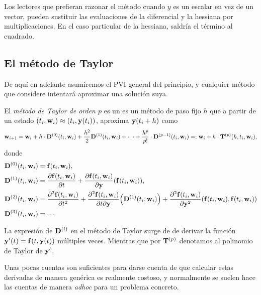 Los lectores que prefieran razonar el método
cuando $y$ es un escalar en vez de un vector,
pueden sustituir las evaluaciones de la diferencial y la hessiana
por multiplicaciones.
En el caso particular de la hessiana, saldría el término al cuadrado.

\subsection{El método de Taylor}
 
De aquí en adelante asumiremos el PVI general del principio,
y cualquier método que considere intentará aproximar una solución suya.

\begin{method}\label{met:taylor}
    \newcommand{\D}{\vb{D}}

    El \emph{método de Taylor de orden $p$} es un es un método de paso fijo $h$
    que a partir de un estado $(t_i, \vb{w}_i) \approx (t_i, \vb{y}(t_i))$,
    aproxima $\vb{y}(t_i + h)$ como
    \begin{equation*}
        \vw_{i+1} =
        \vw_i + h\cdot \D^{(0)}(t_i, \vw_i)
            + \frac{h^2}{2}\D^{(1)}(t_i, \vw_i)
            + \cdots
            + \frac{h^p}{p!}\cdot \D^{(p-1)}(t_i, \vw_i) =:
        \vw_i + h\cdot \vb{T}^{(p)}(h, t_i, \vw_i),
    \end{equation*}
    donde
    \begin{align*}
        \D^{(0)}(t_i, \vw_i) &= \vf(t_i, \vw_i), \\
        \D^{(1)}(t_i, \vw_i) &=
            \pdv{\vf(t_i, \vw_i)}{t} +
            \pdv{\vf(t_i, \vw_i)}{\vy}\qty(\vf(t_i, \vw_i)), \\
        \D^{(2)}(t_i, \vw_i) &=
            \pdv[2]{\vf(t_i, \vw_i)}{t} +
            \pdv{\vf(t_i, \vw_i)}{t}{\vy}\qty(\D^{(1)}(t_i, \vw_i)) +
            \pdv[2]{\vf(t_i, \vw_i)}{\vy}\qty(
                \vf(t_i, \vw_i), \vf(t_i, \vw_i)
            ) \\
        \D^{(3)}(t_i, \vw_i) &= \cdots
    \end{align*}
\end{method}

\begin{remark}
    La expresión de $\vb{D}^{(i)}$ en el método de Taylor surge
    de de derivar la función $\vb{y}'(t) = \vb{f}(t, \vb{y}(t))$ múltiples veces.
    Mientras que por $\vb{T}^{(p)}$ denotamos al
    polinomio de Taylor de $\vb{y}'$.
\end{remark}

Unas pocas cuentas son suficientes para darse cuenta de que
calcular estas derivadas de manera genérica es realmente costoso,
y normalmente se suelen hace las cuentas de manera \emph{adhoc}
para un problema concreto.

